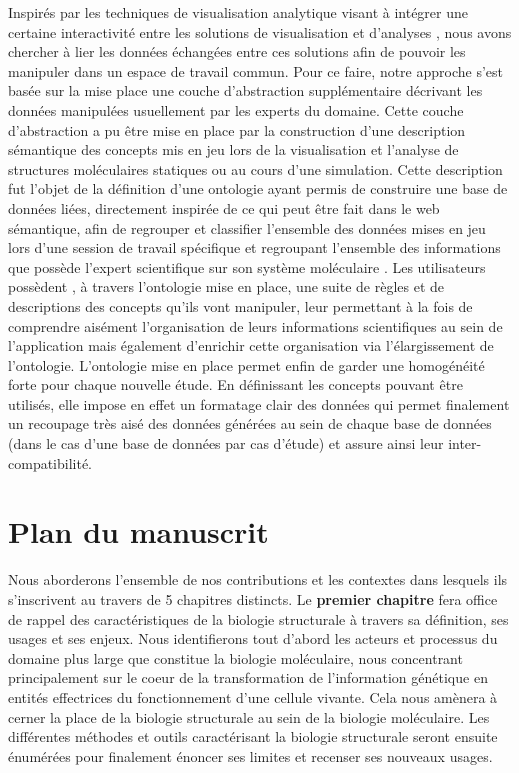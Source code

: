 Inspirés par les techniques de visualisation analytique visant à intégrer une certaine interactivité entre les solutions de visualisation et d'analyses \cite{kielman2009foundations}, nous avons chercher à lier les données échangées entre ces solutions afin de pouvoir les manipuler dans un espace de travail commun.
Pour ce faire, notre approche s'est basée sur la mise place une couche d'abstraction supplémentaire décrivant les données manipulées usuellement par les experts du domaine. Cette couche d'abstraction a pu être mise en place par la construction d'une description sémantique des concepts mis en jeu lors de la visualisation et l'analyse de structures moléculaires statiques ou au cours d'une simulation. Cette description fut l'objet de la définition d'une ontologie ayant permis de construire une base de données liées, directement inspirée de ce qui peut être fait dans le web sémantique, afin de regrouper et classifier l'ensemble des données mises en jeu lors d'une session de travail spécifique et regroupant l'ensemble des informations que possède l'expert scientifique sur son système moléculaire \cite{berners2001semantic}. Les utilisateurs possèdent , à travers l'ontologie mise en place, une suite de règles et de descriptions des concepts qu'ils vont manipuler, leur permettant à la fois de comprendre aisément l'organisation de leurs informations scientifiques au sein de l'application mais également d'enrichir cette organisation via l'élargissement de l'ontologie. L'ontologie mise en place permet enfin de garder une homogénéité forte pour chaque nouvelle étude. En définissant les concepts pouvant être utilisés, elle impose en effet un formatage clair des données qui permet finalement un recoupage très aisé des données générées au sein de chaque base de données (dans le cas d'une base de données par cas d'étude) et assure ainsi leur inter-compatibilité.


\section*{Plan du manuscrit}

Nous aborderons l'ensemble de nos contributions et les contextes dans lesquels ils s'inscrivent au travers de 5 chapitres distincts. 
Le \textbf{premier chapitre} fera office de rappel des caractéristiques de la biologie structurale à travers sa définition, ses usages et ses enjeux. Nous identifierons tout d'abord les acteurs et processus du domaine plus large que constitue la biologie moléculaire, nous concentrant principalement sur le coeur de la transformation de l'information génétique en entités effectrices du fonctionnement d'une cellule vivante. Cela nous amènera à cerner la place de la biologie structurale au sein de la biologie moléculaire. Les différentes méthodes et outils caractérisant la biologie structurale seront ensuite énumérées pour finalement énoncer ses limites et recenser ses nouveaux usages.

